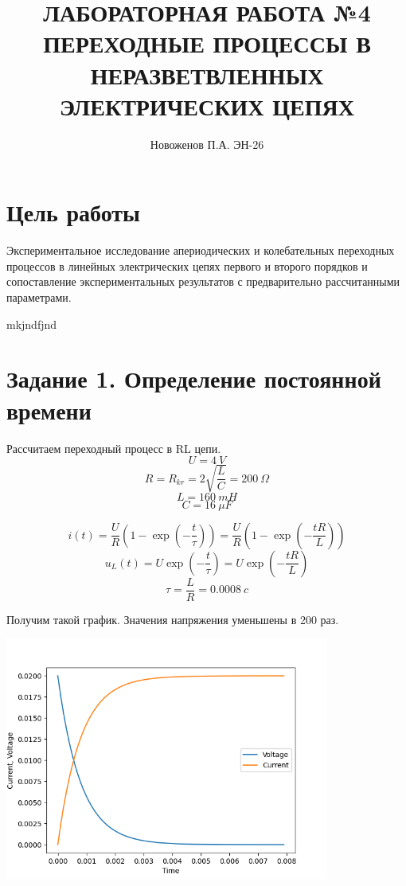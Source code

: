 \documentclass[14pt, a4paper]{article}
\title{ЛАБОРАТОРНАЯ РАБОТА №4
ПЕРЕХОДНЫЕ ПРОЦЕССЫ В НЕРАЗВЕТВЛЕННЫХ
ЭЛЕКТРИЧЕСКИХ ЦЕПЯХ
}
\author{Новоженов П.А. ЭН-26}
\date{}
\begin{document}
    \maketitle

    \thispagestyle{empty}

    \clearpage

    \section*{Цель работы}
        Экспериментальное исследование апериодических и колебательных
        переходных процессов в линейных электрических цепях первого и второго
        порядков и сопоставление экспериментальных результатов с предварительно
        рассчитанными параметрами.

        mkjndfjnd
        
    \section*{Задание 1. Определение постоянной времени}
        Рассчитаем переходный процесс в RL цепи.
        $$U = 4 \ V$$
        $$R = R_{kr} = 2\sqrt{\frac{L}{C}} = 200 \ \Omega$$
        $$L = 160\  mH$$
        $$C = 16 \ \mu F$$

        $$i(t) = \frac{U}{R} (1 - \exp(-\frac{t}{\tau})) = \frac{U}{R} (1 - \exp(-\frac{tR}{L}))$$
        $$u_L(t) = U\exp(-\frac{t}{\tau}) = U \exp(-\frac{tR}{L})$$
        $$\tau = \frac{L}{R} = 0.0008 \ c$$

        Получим такой график. Значения напряжения уменьшены в 200 раз.

        {
            \includegraphics[width=0.8\textwidth]{plot_1.png}
            \centering
        }
\end{document}
